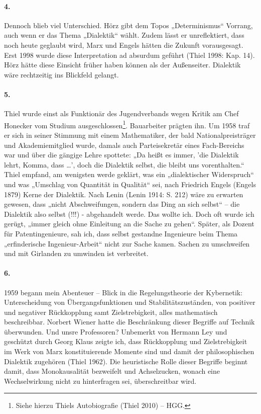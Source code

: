 \documentclass[a4paper,11pt]{article}
\begin{document}
\paragraph{4.}
Dennoch blieb viel Unterschied. Hörz gibt dem Topos „Determinismus“ Vorrang,
auch wenn er das Thema „Dialektik“ wählt. Zudem lässt er unreflektiert, dass
noch heute geglaubt wird, Marx und Engels hätten die Zukunft vorausgesagt.
Erst 1998 wurde diese Interpretation ad absurdum geführt (Thiel 1998:
Kap. 14).  Hörz hätte diese Einsicht früher haben können als der
Außenseiter. Dialektik wäre rechtzeitig ins Blickfeld gelangt.

\paragraph{5.}
Thiel wurde einst als Funktionär des Jugendverbands wegen Kritik am Chef
Honecker vom Studium ausgeschlossen\footnote{Siehe hierzu Thiels Autobiografie
  (Thiel 2010) -- HGG.}. Bauarbeiter prägten ihn. Um 1958 traf er sich in
seiner Stimmung mit einem Mathematiker, der bald Nationalpreisträger und
Akademiemitglied wurde, damals auch Parteisekretär eines Fach-Bereichs war und
über die gängige Lehre spottete: „Da heißt es immer, 'die Dialektik lehrt,
Komma, dass \ldots', doch die Dialektik selbst, die bleibt uns vorenthalten.“
Thiel empfand, am wenigsten werde geklärt, was ein „dialektischer Widerspruch“
und was „Umschlag von Quantität in Qualität“ sei, nach Friedrich Engels
(Engels 1879) Kerne der Dialektik. Nach Lenin (Lenin 1914: S. 212) wäre zu
erwarten gewesen, dass „nicht Abschweifungen, sondern das Ding an sich selbst“
– die Dialektik also selbst (!!!) - abgehandelt werde. Das wollte ich. Doch
oft wurde ich gerügt, „immer gleich ohne Einleitung an die Sache zu gehen“.
Später, als Dozent für Patentingenieure, sah ich, dass selbst gestandne
Ingenieure beim Thema „erfinderische Ingenieur-Arbeit“ nicht zur Sache kamen.
Sachen zu umschweifen und mit Girlanden zu umwinden ist verbreitet.

\paragraph{6.}
1959 begann mein Abenteuer -- Blick in die Regelungstheorie der Kybernetik:
Unterscheidung von Übergangsfunktionen und Stabilitätszuständen, von positiver
und negativer Rückkopplung samt Zielstrebigkeit, alles mathematisch
beschreibbar.  Norbert Wiener hatte die Beschränkung dieser Begriffe auf
Technik überwunden. Und unsre Professoren? Unbemerkt von Hermann Ley und
geschützt durch Georg Klaus zeigte ich, dass Rückkopplung und Zielstrebigkeit
im Werk von Marx konstituierende Momente sind und damit der philosophischen
Dialektik zugehören (Thiel 1962). Die heuristische Rolle dieser Begriffe
beginnt damit, dass Monokausalität bezweifelt und Achselzucken, wonach eine
Wechselwirkung nicht zu hinterfragen sei, überschreitbar wird.
\end{document}
